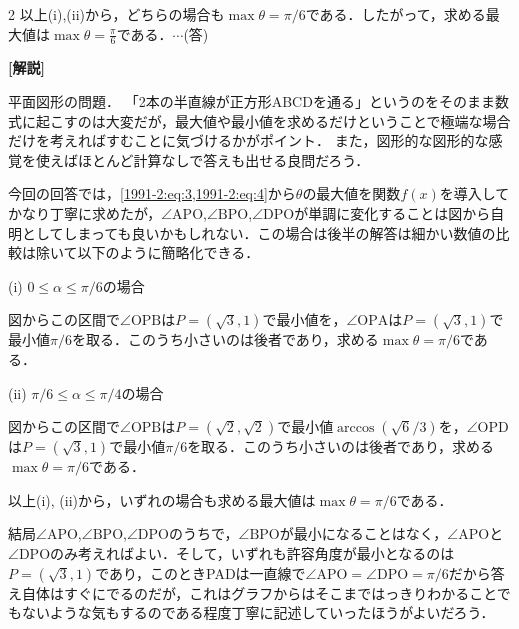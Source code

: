 \documentclass[../../main.tex]{subfiles}
\begin{document}
\begin{multicols}{2}
  \vspace{10pt}
  以上(i),(ii)から，どちらの場合も$\max \theta = \pi/6$である．したがって，求める最大値は$\displaystyle \max\theta = \frac{\pi}{6}$である．$\cdots$(答)

  \vspace{10pt}
  {\bf[解説]}

  平面図形の問題．
  「2本の半直線が正方形ABCDを通る」というのをそのまま数式に起こすのは大変だが，最大値や最小値を求めるだけということで極端な場合だけを考えればすむことに気づけるかがポイント．
  また，図形的な図形的な感覚を使えばほとんど計算なしで答えも出せる良問だろう．

  今回の回答では，\cref{1991-2:eq:3,1991-2:eq:4}から$\theta$の最大値を関数$f(x)$を導入してかなり丁寧に求めたが，$\angle \mathrm{APO}$,$\angle \mathrm{BPO}$,$\angle \mathrm{DPO}$が単調に変化することは図から自明としてしまっても良いかもしれない．この場合は後半の解答は細かい数値の比較は除いて以下のように簡略化できる．

  \vspace{10pt}
  (i) $0 \le \alpha \le \pi/6$の場合

  図からこの区間で$\angle \mathrm{OPB}$は$P=(\sqrt{3},1)$で最小値を，$\angle \mathrm{OPA}$は$P=(\sqrt{3},1)$で最小値$\pi/6$を取る．このうち小さいのは後者であり，求める$\max\theta=\pi/6$である．

  \vspace{10pt}
  (ii) $\pi/6 \le \alpha \le \pi/4$の場合

  図からこの区間で$\angle \mathrm{OPB}$は$P=(\sqrt{2},\sqrt{2})$で最小値$\arccos(\sqrt{6}/3)$を，$\angle \mathrm{OPD}$は$P=(\sqrt{3},1)$で最小値$\pi/6$を取る．このうち小さいのは後者であり，求める$\max\theta=\pi/6$である．

  以上(i), (ii)から，いずれの場合も求める最大値は$\max\theta=\pi/6$である．

  結局$\angle \mathrm{APO}$,$\angle \mathrm{BPO}$,$\angle \mathrm{DPO}$のうちで，$\angle \mathrm{BPO}$が最小になることはなく，$\angle \mathrm{APO}$と$\angle \mathrm{DPO}$のみ考えればよい．そして，いずれも許容角度が最小となるのは$P=(\sqrt{3},1)$であり，このときPADは一直線で$\angle \mathrm{APO}=\angle \mathrm{DPO}=\pi/6$だから答え自体はすぐにでるのだが，これはグラフからはそこまではっきりわかることでもないような気もするのである程度丁寧に記述していったほうがよいだろう．

  \begin{figure}[H]
    \centering
\end{figure}
\end{multicols}
\end{document}
